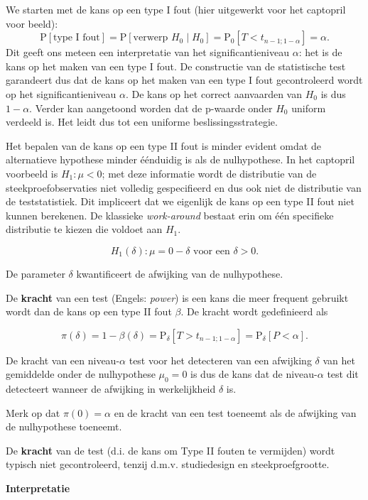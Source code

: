 \documentclass[12pt,dutch,coursenotes]{book}
\theoremstyle{definition}
\theoremstyle{definition}
\theoremstyle{definition}
\theoremstyle{remark}
\begin{document}
We starten met de kans op een type I fout (hier uitgewerkt voor het
captopril voor beeld):
\[\text{P}\left[\text{type I fout}\right]=\text{P}\left[\text{verwerp }H_0 \mid H_0\right] = \text{P}_0\left[T<t_{n-1;1-\alpha}\right]=\alpha.\]
Dit geeft ons meteen een interpretatie van het significantieniveau
\(\alpha\): het is de kans op het maken van een type I fout. De
constructie van de statistische test garandeert dus dat de kans op het
maken van een type I fout gecontroleerd wordt op het significantieniveau
\(\alpha\). De kans op het correct aanvaarden van \(H_0\) is dus
\(1-\alpha\). Verder kan aangetoond worden dat de p-waarde onder \(H_0\)
uniform verdeeld is. Het leidt dus tot een uniforme
beslissingsstrategie.

Het bepalen van de kans op een type II fout is minder evident omdat de
alternatieve hypothese minder éénduidig is als de nulhypothese. In het
captopril voorbeeld is \(H_1: \mu<0\); met deze informatie wordt de
distributie van de steekproefobservaties niet volledig gespecifieerd en
dus ook niet de distributie van de teststatistiek. Dit impliceert dat we
eigenlijk de kans op een type II fout niet kunnen berekenen. De
klassieke \emph{work-around} bestaat erin om één specifieke distributie
te kiezen die voldoet aan \(H_1\).

\[H_1(\delta): \mu=0-\delta \text{ voor een }\delta>0.\]

De parameter \(\delta\) kwantificeert de afwijking van de nulhypothese.

De \textbf{kracht} van een test (Engels: \emph{power}) is een kans die
meer frequent gebruikt wordt dan de kans op een type II fout \(\beta\).
De kracht wordt gedefinieerd als

\[\pi(\delta) = 1-\beta(\delta) = \text{P}_\delta\left[T>t_{n-1;1-\alpha}\right]=\text{P}_\delta\left[P<\alpha\right].\]

De kracht van een niveau-\(\alpha\) test voor het detecteren van een
afwijking \(\delta\) van het gemiddelde onder de nulhypothese
\(\mu_0=0\) is dus de kans dat de niveau-\(\alpha\) test dit detecteert
wanneer de afwijking in werkelijkheid \(\delta\) is.

Merk op dat \(\pi(0)=\alpha\) en de kracht van een test toeneemt als de
afwijking van de nulhypothese toeneemt.

De \textbf{kracht} van de test (d.i. de kans om Type II fouten te
vermijden) wordt typisch niet gecontroleerd, tenzij d.m.v. studiedesign
en steekproefgrootte.

\textbf{Interpretatie}
\end{document}

